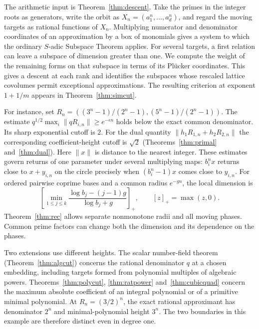 \documentclass[11pt,a4paper,reqno]{amsart}
\theoremstyle{definition}
\theoremstyle{remark}
\numberwithin{equation}{section}
\begin{document}
The arithmetic input is Theorem~\ref{thm:descent}. Take the primes in the integer roots as generators, write the orbit as \(X_n=(a_1^n,\ldots,a_d^n)\), and regard the moving targets as rational functions of \(X_n\). Multiplying numerator and denominator coordinates of an approximation by a box of monomials gives a system to which the ordinary \(S\)-adic Subspace Theorem applies. For several targets, a first relation can leave a subspace of dimension greater than one. We compute the weight of the remaining forms on that subspace in terms of its Pl\"ucker coordinates. This gives a descent at each rank and identifies the subspaces whose rescaled lattice covolumes permit exceptional approximations. The resulting criterion at exponent \(1+1/m\) appears in Theorem~\ref{thm:simcut}.

For instance, set \(R_n=((3^n-1)/(2^n-1),(5^n-1)/(2^n-1))\). The estimate \(q^{1/2}\max_i\|qR_{i,n}\|\ge e^{-\epsilon n}\) holds below the exact common denominator. Its sharp exponential cutoff is \(2\). For the dual quantity \(\|h_1R_{1,n}+h_2R_{2,n}\|\) the corresponding coefficient-height cutoff is \(\sqrt2\) (Theorems~\ref{thm:primal} and~\ref{thm:dual}). Here \(\|x\|\) is distance to the nearest integer. These estimates govern returns of one parameter under several multiplying maps: \(b_i^nx\) returns close to \(x+y_{i,n}\) on the circle precisely when \((b_i^n-1)x\) comes close to \(y_{i,n}\). For ordered pairwise coprime bases and a common radius \(e^{-gn}\), the local dimension is
\[
              \left[\min_{1\le j\le k}
              \frac{\log b_j-(j-1)g}{\log b_j+g}\right]_+ ,
              \qquad [z]_+=\max(z,0).
\]
Theorem~\ref{thm:rec} allows separate nonmonotone radii and all moving phases. Common prime factors can change both the dimension and its dependence on the phases.

Two extensions use different heights. The scalar number-field theorem (Theorem~\ref{thm:algcut}) concerns the rational denominator \(q\) at a chosen embedding, including targets formed from polynomial multiples of algebraic powers. Theorems~\ref{thm:polycut}, \ref{thm:ratpower} and~\ref{thm:cubicquad} concern the maximum absolute coefficient of an integral polynomial or of a primitive minimal polynomial. At \(R_n=(3/2)^n\), the exact rational approximant has denominator \(2^n\) and minimal-polynomial height \(3^n\). The two boundaries in this example are therefore distinct even in degree one.
\end{document}
